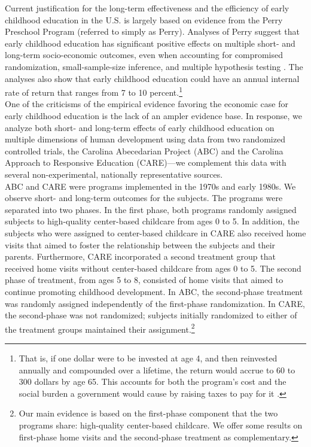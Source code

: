 \noindent  Current justification for the long-term effectiveness and the efficiency of early childhood education in the U.S. is largely based on evidence from the Perry Preschool Program (referred to simply as Perry). Analyses of Perry suggest that early childhood education has significant positive effects on multiple short- and long-term socio-economic outcomes, even when accounting for compromised randomization, small-sample-size inference, and multiple hypothesis testing \citep{Heckman_Moon_etal_2010_QE}. The analyses also show that early childhood education could have an annual internal rate of return that ranges from 7 to 10 percent.\footnote{That is, if one dollar were to be invested at age 4, and then reinvested annually and compounded over a lifetime, the return would accrue to 60 to 300 dollars by age 65. This accounts for both the program's cost and the social burden a government would cause by raising taxes to pay for it \citep{Heckman_Moon_etal_2010_RateofReturn}.}\\

\noindent One of the criticisms of the empirical evidence favoring the economic case for early childhood education is the lack of an ampler evidence base. In response, we analyze both short- and long-term effects of early childhood education on multiple dimensions of human development using data from two randomized controlled trials, the Carolina Abecedarian Project (ABC) and the Carolina Approach to Responsive Education (CARE)---we complement this data with several non-experimental, nationally representative sources.\\

\noindent ABC and CARE were programs implemented in the 1970s and early 1980s. We observe short- and long-term outcomes for the subjects. The programs were separated into two phases. In the first phase, both programs randomly assigned subjects to high-quality center-based childcare from ages 0 to 5. In addition, the subjects who were assigned to center-based childcare in CARE also received home visits that aimed to foster the relationship between the subjects and their parents. Furthermore, CARE incorporated a second treatment group that received home visits without center-based childcare from ages 0 to 5. The second phase of treatment, from ages 5 to 8, consisted of home visits that aimed to continue promoting childhood development. In ABC, the second-phase treatment was randomly assigned independently of the first-phase randomization. In CARE, the second-phase was not randomized; subjects initially randomized to either of the treatment groups maintained their assignment.\footnote{Our main evidence is based on the first-phase component that the two programs share: high-quality center-based childcare. We offer some results on first-phase home visits and the second-phase treatment as complementary.}\\

